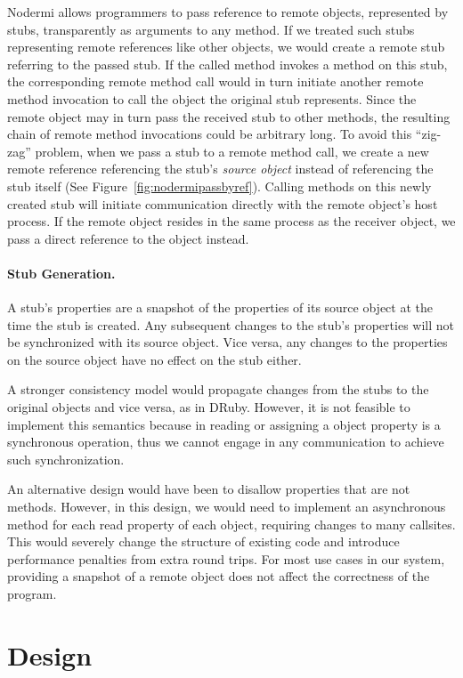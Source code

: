 Nodermi allows programmers to pass reference to remote objects,
represented by stubs, transparently as arguments to any method.
If we treated such stubs representing remote references like other
objects, we would create a remote stub referring to the passed stub.
If the called method invokes a method on this stub,
the corresponding remote method call would in turn initiate another
remote method invocation to call the object the original stub represents.
Since the remote object may in turn pass the received stub to other
methods, the resulting chain of remote method invocations could
be arbitrary long.
To avoid this ``zig-zag'' problem, when we pass a stub to a remote method call,
we create a new remote reference referencing
 the stub's \emph{source object} instead of referencing the stub itself
 (See Figure~\ref{fig:nodermipassbyref}).
Calling methods on this newly created stub will initiate
communication directly with the remote object's host process.
If the remote object resides in the same process as the
receiver object, we pass a direct reference to the object
instead.

\paragraph{Stub Generation.}
A stub's properties are a snapshot of the properties
of its source object at the time the stub is created.
Any subsequent changes to the stub's properties will not
be synchronized with its source object.
Vice versa, any changes to the properties on the source object
have no effect on the stub either.

A stronger consistency  model would propagate changes from
the stubs to the original objects and vice versa, as in DRuby\cite{druby}.
However, it is not feasible to implement this semantics because
in \js{} reading or assigning a object property is a synchronous
operation, thus we cannot engage in any communication to achieve
such synchronization.

An alternative design would have been to disallow properties that
are not methods.
However, in this design, we would need to implement an asynchronous method
for each read property of each object, requiring changes to many
callsites.
This would severely change the structure of existing code
and introduce performance penalties from extra round trips.
For most use cases in our system, providing a snapshot of a
remote object does not affect the correctness of the program.


\section{Design}

